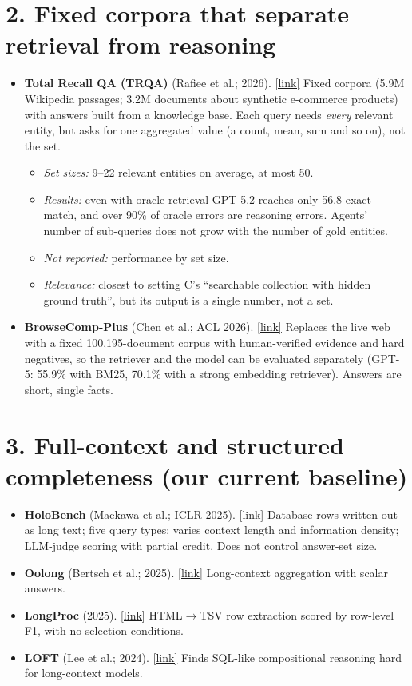 \documentclass[10pt]{article}
\newcommand{\paper}[3]{\textbf{#1} \textnormal{(#2)}. \href{#3}{\small[link]}}
\begin{document}
\section*{2. Fixed corpora that separate retrieval from reasoning}
\begin{itemize}
\item \paper{Total Recall QA (TRQA)}{Rafiee et al.; 2026}{https://arxiv.org/abs/2603.18516}
Fixed corpora (5.9M Wikipedia passages; 3.2M documents about synthetic e-commerce products) with answers built
from a knowledge base. Each query needs \emph{every} relevant entity, but asks for one aggregated value (a count,
mean, sum and so on), not the set.
  \begin{itemize}
  \item \emph{Set sizes:} 9--22 relevant entities on average, at most 50.
  \item \emph{Results:} even with oracle retrieval GPT-5.2 reaches only 56.8 exact match, and over 90\% of oracle
  errors are reasoning errors. Agents' number of sub-queries does not grow with the number of gold entities.
  \item \emph{Not reported:} performance by set size.
  \item \emph{Relevance:} closest to setting C's ``searchable collection with hidden ground truth'', but its output
  is a single number, not a set.
  \end{itemize}
\item \paper{BrowseComp-Plus}{Chen et al.; ACL 2026}{https://arxiv.org/abs/2508.06600}
Replaces the live web with a fixed 100,195-document corpus with human-verified evidence and hard negatives, so the
retriever and the model can be evaluated separately (GPT-5: 55.9\% with BM25, 70.1\% with a strong embedding
retriever). Answers are short, single facts.
\end{itemize}

\section*{3. Full-context and structured completeness (our current baseline)}
\begin{itemize}
\item \paper{HoloBench}{Maekawa et al.; ICLR 2025}{https://arxiv.org/abs/2410.11996}
Database rows written out as long text; five query types; varies context length and information density;
LLM-judge scoring with partial credit. Does not control answer-set size.
\item \paper{Oolong}{Bertsch et al.; 2025}{https://arxiv.org/abs/2511.02817} Long-context aggregation with scalar
answers.
\item \paper{LongProc}{2025}{https://arxiv.org/abs/2501.05414} HTML$\to$TSV row extraction scored by row-level F1,
with no selection conditions.
\item \paper{LOFT}{Lee et al.; 2024}{https://arxiv.org/abs/2406.13121} Finds SQL-like compositional reasoning hard
for long-context models.
\end{itemize}
\end{document}
